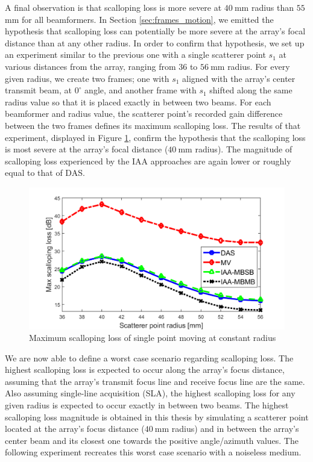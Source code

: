 A final observation is that scalloping loss is more severe at $40~$mm radius than $55~$mm for all beamformers. In Section \ref{sec:frames_motion}, we emitted the hypothesis that scalloping loss can potentially be more severe at the array's focal distance than at any other radius.
In order to confirm that hypothesis, we set up an experiment similar to the previous one with a single scatterer point $s_1$ at various distances from the array, ranging from $36$ to $56~$mm radius.
For every given radius, we create two frames; one with $s_1$ aligned with the array's center transmit beam, at $0^\circ$ angle, and another frame with $s_1$ shifted along the same radius value so that it is placed exactly in between two beams.
For each beamformer and radius value, the scatterer point's recorded gain difference between the two frames defines its maximum scalloping loss.
The results of that experiment, displayed in Figure \ref{fig:loss_vs_range}, confirm the hypothesis that the scalloping loss is most severe at the array's focal distance ($40~$mm radius).
The magnitude of scalloping loss experienced by the IAA approaches are again lower or roughly equal to that of DAS.
\begin{figure}[ht]
    \centering
    \includegraphics[width=\linewidth]{./images/results/1/loss_vs_range.png}
	\caption{Maximum scalloping loss of single point moving at constant radius}
	\label{fig:loss_vs_range}
\end{figure}

We are now able to define a worst case scenario regarding scalloping loss. The highest scalloping loss is expected to occur along the array's focus distance, assuming that the array's transmit focus line and receive focus line are the same.
Also assuming single-line acquisition (SLA), the highest scalloping loss for any given radius is expected to occur exactly in between two beams.
The highest scalloping loss magnitude is obtained in this thesis by simulating a scatterer point located at the array's focus distance ($40~$mm radius) and in between the array's center beam and its closest one towards the positive angle/azimuth values.
The following experiment recreates this worst case scenario with a noiseless medium.

